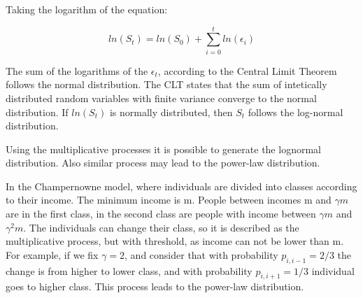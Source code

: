 Taking the logarithm of the equation:

$$ln(S_t) = ln(S_0) + \sum_{i=0}^{t} ln(\epsilon_i)$$

The sum of the logarithms of the $\epsilon_t$, according to the Central Limit Theorem follows the normal distribution. The CLT states that the sum of intetically distributed random variables with finite variance converge to the normal distribution. If $ln(S_t)$ is normally distributed, then $S_t$ follows the log-normal distribution.   

Using the multiplicative processes it is possible to generate the lognormal distribution. Also similar process may lead to the power-law distribution. 

In the Champernowne model, where individuals are divided into classes according to their income. The minimum income is m. People between incomes m and $\gamma m$ are in the first class, in the second class are people with income between $\gamma m$ and $\gamma^2 m $. The individuals can change their class, so it is described as the multiplicative process, but with threshold, as income can not be lower than m. For example, if we fix $\gamma=2$, and consider that with probability $p_{i,i-1}=2/3$ the change is from higher to lower class, and with probability $p_{i, i+1}=1/3$ individual goes to higher class. This process leads to the power-law distribution.




